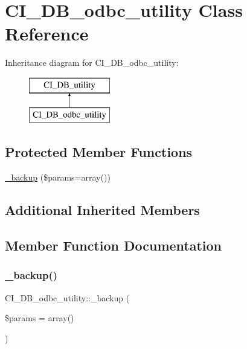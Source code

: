 \hypertarget{class_c_i___d_b__odbc__utility}{}\section{C\+I\+\_\+\+D\+B\+\_\+odbc\+\_\+utility Class Reference}
\label{class_c_i___d_b__odbc__utility}
Inheritance diagram for C\+I\+\_\+\+D\+B\+\_\+odbc\+\_\+utility\+:\begin{figure}[H]
\begin{center}
\leavevmode
\includegraphics[height=2.000000cm]{class_c_i___d_b__odbc__utility}
\end{center}
\end{figure}
\subsection*{Protected Member Functions}
\begin{DoxyCompactItemize}
\item 
\mbox{\hyperlink{class_c_i___d_b__odbc__utility_a4498ddeae747d4d880910294e0a52ded}{\+\_\+backup}} (\$params=array())
\end{DoxyCompactItemize}
\subsection*{Additional Inherited Members}


\subsection{Member Function Documentation}
\mbox{\label{class_c_i___d_b__odbc__utility_a4498ddeae747d4d880910294e0a52ded}} 
\subsubsection{\texorpdfstring{\+\_\+backup()}{\_backup()}}
{\footnotesize\ttfamily C\+I\+\_\+\+D\+B\+\_\+odbc\+\_\+utility\+::\+\_\+backup (\begin{DoxyParamCaption}\item[{}]{\$params = {\ttfamily array()} }\end{DoxyParamCaption})\hspace{0.3cm}{\ttfamily [protected]}}

